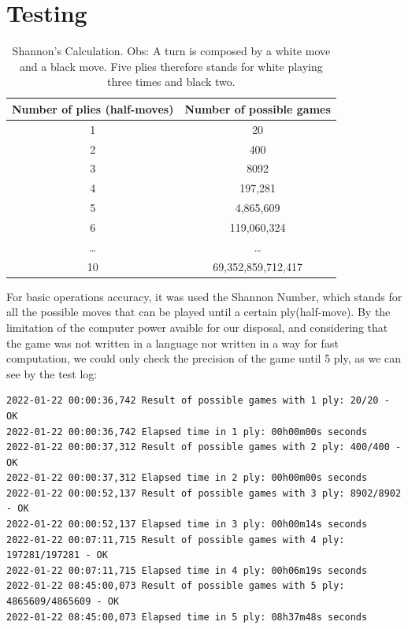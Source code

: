 \documentclass[10pt]{article}
\begin{document}
\section{Testing}

\begin{table}[H]
\center
\begin{tabular}{|c|c|}
\hline
\textbf{Number of plies (half-moves)}  & \textbf{Number of possible games}  \\
\hline
  1   & 20 \\
\hline
   2  &  400 \\
\hline
  3   & 8092 \\
\hline
4  & 197,281 \\
\hline
5   & 4,865,609 \\
\hline
6   & 119,060,324 \\
\hline
\ldots & \ldots \\
\hline
10 & 69,352,859,712,417 \\
\hline
\end{tabular}
\caption{Shannon's Calculation. Obs: A turn is composed by a white move and a black move. Five plies
therefore stands for white playing three times and black two.}
\end{table}

For basic operations accuracy, it was used the Shannon Number,
which stands for all the possible moves that can be played until a certain
ply(half-move). By the limitation of the computer power avaible for our
disposal, and considering that the game was not written in a language nor
written in a way for fast computation, we could only check the precision of the
game until 5 ply, as we can see by the test log:
\begin{lstlisting}
2022-01-22 00:00:36,742 Result of possible games with 1 ply: 20/20 - OK
2022-01-22 00:00:36,742 Elapsed time in 1 ply: 00h00m00s seconds
2022-01-22 00:00:37,312 Result of possible games with 2 ply: 400/400 - OK
2022-01-22 00:00:37,312 Elapsed time in 2 ply: 00h00m00s seconds
2022-01-22 00:00:52,137 Result of possible games with 3 ply: 8902/8902 - OK
2022-01-22 00:00:52,137 Elapsed time in 3 ply: 00h00m14s seconds
2022-01-22 00:07:11,715 Result of possible games with 4 ply: 197281/197281 - OK
2022-01-22 00:07:11,715 Elapsed time in 4 ply: 00h06m19s seconds
2022-01-22 08:45:00,073 Result of possible games with 5 ply: 4865609/4865609 - OK
2022-01-22 08:45:00,073 Elapsed time in 5 ply: 08h37m48s seconds
    
\end{lstlisting}
\end{document}
